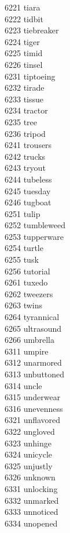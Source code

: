 6221 tiara \\
6222 tidbit \\
6223 tiebreaker \\
6224 tiger \\
6225 timid \\
6226 tinsel \\
6231 tiptoeing \\
6232 tirade \\
6233 tissue \\
6234 tractor \\
6235 tree \\
6236 tripod \columnbreak \\
6241 trousers \\
6242 trucks \\
6243 tryout \\
6244 tubeless \\
6245 tuesday \\
6246 tugboat \\
6251 tulip \\
6252 tumbleweed \\
6253 tupperware \\
6254 turtle \\
6255 tusk \\
6256 tutorial \\
6261 tuxedo \\
6262 tweezers \\
6263 twins \\
6264 tyrannical \\
6265 ultrasound \\
6266 umbrella \\
6311 umpire \\
6312 unarmored \\
6313 unbuttoned \\
6314 uncle \\
6315 underwear \\
6316 unevenness \\
6321 unflavored \\
6322 ungloved \\
6323 unhinge \\
6324 unicycle \\
6325 unjustly \\
6326 unknown \\
6331 unlocking \\
6332 unmarked \\
6333 unnoticed \\
6334 unopened \\
